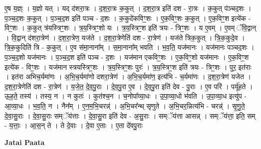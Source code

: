 \documentclass[17pt]{extarticle}
\begin{document}
ए॒ष य॒ज्ञ्ः । य॒ज्ञो यत् । यद् द॑शरा॒त्रः । द॒श॒रा॒त्रः क॒कुत् । द॒श॒रा॒त्र इति॑ दश - रा॒त्रः । क॒कुत् प॑ञ्चद॒शः । प॒ञ्च॒द॒शः क॒कुत् । प॒ञ्च॒द॒श इति॑ पञ्च - द॒शः । क॒कुदे॑कविꣳ॒॒शः । ए॒क॒विꣳ॒॒शः क॒कुत् । ए॒क॒विꣳ॒॒श इत्ये॑क - विꣳ॒॒शः । क॒कुत् त्र॑यस्त्रिꣳ॒॒शः । त्र॒य॒स्त्रिꣳ॒॒शो यः । त्र॒य॒स्त्रिꣳ॒॒श इति॑ त्रयः - त्रिꣳ॒॒शः । य ए॒वम् । ए॒वम् ॅवि॒द्वान् । वि॒द्वान् द॑शरा॒त्रेण॑ । द॒श॒रा॒त्रेण॒ यज॑ते । द॒श॒रा॒त्रेणेति॑ दश - रा॒त्रेण॑ । यज॑ते त्रिक॒कुत् । त्रि॒क॒कुदे॒व । त्रि॒क॒कुदिति॑ त्रि - क॒कुत् । ए॒व स॑मा॒नाना᳚म् । स॒मा॒नाना᳚म् भवति । भ॒व॒ति॒ यज॑मानः । यज॑मानः पञ्चद॒शः । प॒ञ्च॒द॒शो यज॑मानः । प॒ञ्च॒द॒श इति॑ पञ्च - द॒शः । यज॑मान एकविꣳ॒॒शः । ए॒क॒विꣳ॒॒शो यज॑मानः । ए॒क॒विꣳ॒॒श इत्ये॑क - विꣳ॒॒शः । यज॑मान स्त्रयस्त्रिꣳ॒॒शः । त्र॒य॒स्त्रिꣳ॒॒शः पुरः॑ । त्र॒य॒स्त्रिꣳ॒॒श इति॑ त्रयः - त्रिꣳ॒॒शः । पुर॒ इत॑राः । इत॑रा अभिच॒र्यमा॑णः । अ॒भि॒च॒र्यमा॑णो दशरा॒त्रेण॑ । अ॒भि॒च॒र्यमा॑ण॒ इत्य॑भि - च॒र्यमा॑णः । द॒श॒रा॒त्रेण॑ यजेत । द॒श॒रा॒त्रेणेति॑ दश - रा॒त्रेण॑ । य॒जे॒त॒ दे॒व॒पु॒राः । दे॒व॒पु॒रा ए॒व । दे॒व॒पु॒रा इति॑ देव - पु॒राः । ए॒व परि॑ । पर्यू॑हते । ऊ॒ह॒ते॒ तस्य॑ । तस्य॒ न । न कुतः॑ । कुत॑श्च॒न । च॒नोपा᳚व्या॒धः । उ॒पा॒व्या॒धो भ॑वति । उ॒पा॒व्या॒ध इत्यु॑प - आ॒व्या॒धः । भ॒व॒ति॒ न । नैन᳚म् । ए॒न॒म॒भि॒चरन्न्॑ । अ॒भि॒चर᳚न्थ् सृणुते । अ॒भि॒चर॒न्नित्य॑भि - चरन्न्॑ । सृ॒णु॒ते॒ दे॒वा॒सु॒राः । दे॒वा॒सु॒राः सम्ॅय॑त्ताः । दे॒वा॒सु॒रा इति॑ देव - अ॒सु॒राः । सम्ॅय॑त्ता आसन्न् । सम्ॅय॑त्ता॒ इति॒ सम् - य॒त्ताः॒ । आ॒स॒न् ते । ते दे॒वाः । दे॒वा ए॒ताः । ए॒ता दे॑वपु॒राः \newline

\textbf{Jatai Paata} \newline
\end{document}
